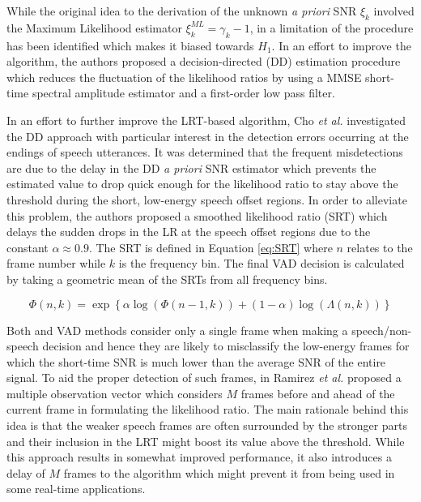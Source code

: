 While the original idea to the derivation of the unknown \emph{a priori} SNR $\xi_k$ involved the Maximum Likelihood estimator $\xi_k^{ML} = \gamma_k - 1$, in \cite{Sohn} a limitation of the procedure has been identified which makes it biased towards $H_1$. In an effort to improve the algorithm, the authors proposed a decision-directed (DD) estimation procedure which reduces the fluctuation of the likelihood ratios by using a MMSE short-time spectral amplitude estimator \cite{Ephraim} and a first-order low pass filter.

In an effort to further improve the LRT-based algorithm, Cho \emph{et al.} \cite{Cho} investigated the DD approach with particular interest in the detection errors occurring at the endings of speech utterances. It was determined that the frequent misdetections are due to the delay in the DD \emph{a priori} SNR estimator which prevents the estimated value to drop quick enough for the likelihood ratio to stay above the threshold during the short, low-energy speech offset regions. In order to alleviate this problem, the authors proposed a smoothed likelihood ratio (SRT) which delays the sudden drops in the LR at the speech offset regions due to the constant $\alpha \approx 0.9$. The SRT is defined in Equation \ref{eq:SRT} where $n$ relates to the frame number while $k$ is the frequency bin. The final VAD decision is calculated by taking a geometric mean of the SRTs from all frequency bins.

\begin{equation}
\Phi (n,k) = \exp \left\{ \alpha \log \left( \Phi (n-1,k) \right) + (1-\alpha) \log \left( \Lambda (n,k) \right) \right\}
\label{eq:SRT}
\end{equation}

Both \cite{Sohn} and \cite{Cho} VAD methods consider only a single frame when making a speech/non-speech decision and hence they are likely to misclassify the low-energy frames for which the short-time SNR is much lower than the average SNR of the entire signal. To aid the proper detection of such frames, in \cite{RamirezMulti} Ramirez \emph{et al.} proposed a multiple observation vector which considers $M$ frames before and ahead of the current frame in formulating the likelihood ratio. The main rationale behind this idea is that the weaker speech frames are often surrounded by the stronger parts and their inclusion in the LRT might boost its value above the threshold. While this approach results in somewhat improved performance, it also introduces a delay of $M$ frames to the algorithm which might prevent it from being used in some real-time applications.

